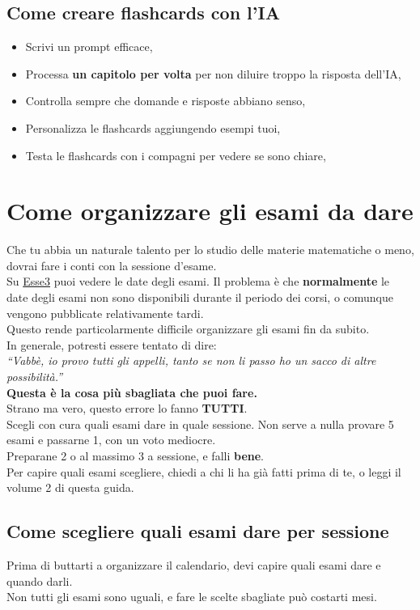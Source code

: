 \documentclass[18pt]{extarticle}
\begin{document}
\subsection{Come creare flashcards con l'IA}
\begin{itemize}
\item Scrivi un prompt efficace,
\item Processa \textbf{un capitolo per volta} per non diluire troppo la risposta dell'IA,
\item Controlla sempre che domande e risposte abbiano senso,
\item Personalizza le flashcards aggiungendo esempi tuoi,
\item Testa le flashcards con i compagni per vedere se sono chiare,
\end{itemize}


\section{Come organizzare gli esami da dare}
Che tu abbia un naturale talento per lo studio delle materie matematiche o meno, dovrai fare i conti con la sessione d'esame.\\
Su \href{https://uniud.esse3.cineca.it/Home.do}{Esse3} puoi vedere le date degli esami. Il problema è che \textbf{normalmente} le date degli esami non sono disponibili durante il periodo dei corsi, o comunque vengono pubblicate relativamente tardi.\\
Questo rende particolarmente difficile organizzare gli esami fin da subito.\\
In generale, potresti essere tentato di dire:\\
\textit{``Vabbè, io provo tutti gli appelli, tanto se non li passo ho un sacco di altre possibilità.''}\\
\textbf{Questa è la cosa più sbagliata che puoi fare.}\\
Strano ma vero, questo errore lo fanno \textbf{TUTTI}.\\
Scegli con cura quali esami dare in quale sessione. Non serve a nulla provare 5 esami e passarne 1, con un voto mediocre.\\
Preparane 2 o al massimo 3 a sessione, e falli \textbf{bene}.\\
Per capire quali esami scegliere, chiedi a chi li ha già fatti prima di te, o leggi il volume 2 di questa guida.


\subsection{Come scegliere quali esami dare per sessione}
Prima di buttarti a organizzare il calendario, devi capire quali esami dare e quando darli.\\
Non tutti gli esami sono uguali, e fare le scelte sbagliate può costarti mesi.
\end{document}
